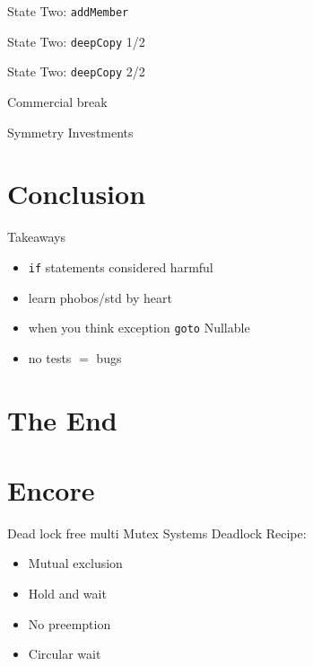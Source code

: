 \documentclass[aspectratio=169,notes]{beamer}
\begin{document}
	\begin{frame}[fragile]{State Two: \lstinline{addMember}}
		
	\end{frame}

	\begin{frame}[fragile]{State Two: \lstinline{deepCopy} 1/2}
		
	\end{frame}

	\begin{frame}[fragile]{State Two: \lstinline{deepCopy} 2/2}
		
	\end{frame}

	\begin{frame}[fragile]{Commercial break}
		\begin{center}
			{\Large Symmetry Investments}
		\end{center}
	\end{frame}

	\section{Conclusion}
	\begin{frame}[fragile]{Takeaways}
		\begin{itemize}
			\item \lstinline{if} statements considered harmful
			\item learn phobos/std by heart
			\item when you think exception \lstinline{goto} Nullable
			\item no tests $=$ bugs
		\end{itemize}
	\end{frame}

	\section{The End}

	\section{Encore}

	\begin{frame}[fragile]{Dead lock free multi Mutex Systems}
		Deadlock Recipe:\\
		\begin{itemize}
			\item Mutual exclusion
			\item Hold and wait
			\item No preemption
			\item Circular wait
		\end{itemize}
	\end{frame}
\end{document}
